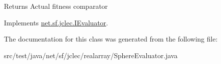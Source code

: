 \begin{DoxyReturn}{Returns}
Actual fitness comparator 
\end{DoxyReturn}


Implements \hyperlink{interfacenet_1_1sf_1_1jclec_1_1_i_evaluator_abb2c06f5383c5aa605561d942305b168}{net.\-sf.\-jclec.\-I\-Evaluator}.



The documentation for this class was generated from the following file\-:\begin{DoxyCompactItemize}
\item 
src/test/java/net/sf/jclec/realarray/Sphere\-Evaluator.\-java\end{DoxyCompactItemize}
